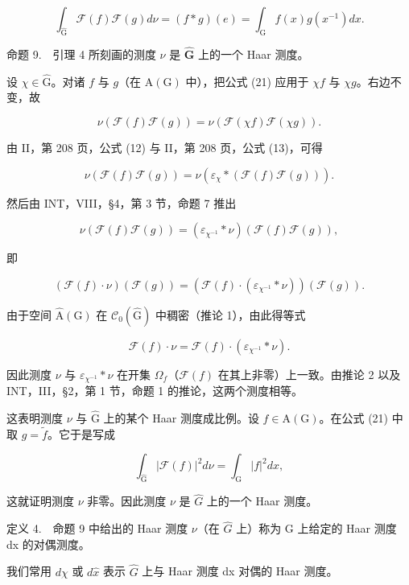 \[
\int_ {\widehat {\mathrm{G}}} \mathcal {F} (f) \mathcal {F} (g) d \nu = (f * g) (e) = \int_ {\mathrm{G}} f (x) g (x ^ {- 1}) d x.\tag{21}
\]

命题 9.　引理 4 所刻画的测度 \(\nu\) 是 \(\widehat{\mathbf{G}}\) 上的一个 Haar 测度。

设 \(\chi \in \widehat{\mathrm{G}}\)。对诸 \(f\) 与 \(g\)（在 \(\mathrm{A}(\mathrm{G})\) 中），把公式 (21) 应用于 \(\chi f\) 与 \(\chi g\)。右边不变，故

\[
\nu (\mathcal {F} (f) \mathcal {F} (g)) = \nu (\mathcal {F} (\chi f) \mathcal {F} (\chi g)).
\]

由 II，第 208 页，公式 (12) 与 II，第 208 页，公式 (13)，可得

\[
\nu (\mathcal {F} (f) \mathcal {F} (g)) = \nu (\varepsilon_ {\chi} * (\mathcal {F} (f) \mathcal {F} (g))).
\]

然后由 INT，VIII，§4，第 3 节，命题 7 推出

\[
\nu (\mathcal {F} (f) \mathcal {F} (g)) = (\varepsilon_ {\chi^ {- 1}} * \nu) (\mathcal {F} (f) \mathcal {F} (g)),
\]

即

\[
(\mathscr {F} (f) \cdot \nu) (\mathscr {F} (g)) = (\mathscr {F} (f) \cdot (\varepsilon_ {\chi^ {- 1}} * \nu)) (\mathscr {F} (g)).
\]

由于空间 \(\widehat{\mathrm{A}}(\mathrm{G})\) 在 \(\mathcal{C}_{0}(\widehat{\mathrm{G}})\) 中稠密（推论 1），由此得等式

\[
\mathscr {F} (f) \cdot \nu = \mathscr {F} (f) \cdot (\varepsilon_ {\chi^ {- 1}} * \nu).
\]

因此测度 \(\nu\) 与 \(\varepsilon_{\chi^{-1}} * \nu\) 在开集 \(\Omega_f\)（\(\mathcal{F}(f)\) 在其上非零）上一致。由推论 2 以及 INT，III，§2，第 1 节，命题 1 的推论，这两个测度相等。

这表明测度 \(\nu\) 与 \(\widehat{\mathrm{G}}\) 上的某个 Haar 测度成比例。设 \(f \in \mathrm{A}(\mathrm{G})\)。在公式 (21) 中取 \(g = \widetilde{f}\)。它于是写成

\[
\int_ {\widehat {\mathrm{G}}} | \mathcal {F} (f) | ^ {2} d \nu = \int_ {\mathrm{G}} | f | ^ {2} d x,\tag{22}
\]

这就证明测度 \(\nu\) 非零。因此测度 \(\nu\) 是 \(\widehat{G}\) 上的一个 Haar 测度。

定义 4.　命题 9 中给出的 Haar 测度 \(\nu\)（在 \(\widehat{G}\) 上）称为 G 上给定的 Haar 测度 dx 的对偶测度。

我们常用 \(d\chi\) 或 \(d\widehat{x}\) 表示 \(\widehat{G}\) 上与 Haar 测度 dx 对偶的 Haar 测度。

